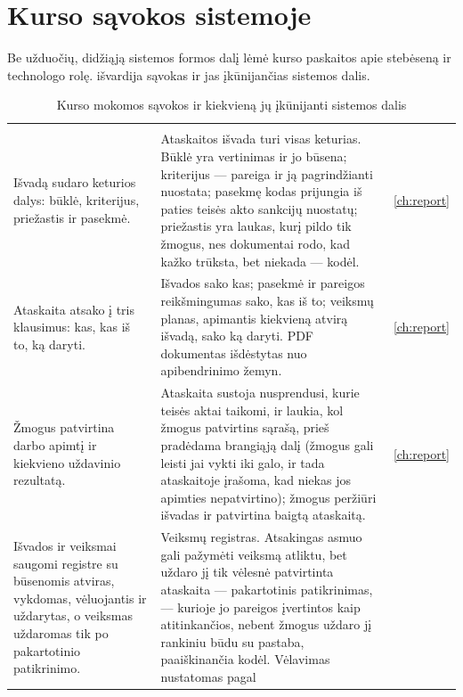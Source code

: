 \section{Kurso sąvokos sistemoje}\label{sec:course:concepts}

Be užduočių, didžiąją sistemos formos dalį lėmė kurso paskaitos apie stebėseną ir technologo
rolę.  išvardija sąvokas ir jas įkūnijančias sistemos dalis.

\begin{xltabular}{\textwidth}{@{}L{40mm}YL{20mm}@{}}
\caption{Kurso mokomos sąvokos ir kiekvieną jų įkūnijanti sistemos dalis}\label{tab:course:concepts}\\
\toprule
{} &  &  \\
\midrule
\endfirsthead
\toprule
{} &  &  \\
\midrule
\endhead
\bottomrule
\endlastfoot
Išvadą sudaro keturios dalys: būklė, kriterijus, priežastis ir pasekmė. &
  Ataskaitos išvada turi visas keturias. Būklė yra vertinimas ir jo būsena; kriterijus ---
  pareiga ir ją pagrindžianti nuostata; pasekmę kodas prijungia iš paties teisės akto sankcijų
  nuostatų; priežastis yra laukas, kurį pildo tik žmogus, nes dokumentai rodo, kad kažko
  trūksta, bet niekada --- kodėl. & \cref{ch:report} \\
Ataskaita atsako į tris klausimus: kas, kas iš to, ką daryti. &
  Išvados sako kas; pasekmė ir pareigos reikšmingumas sako, kas iš to; veiksmų planas, apimantis
  kiekvieną atvirą išvadą, sako ką daryti. PDF dokumentas išdėstytas nuo apibendrinimo žemyn. &
  \cref{ch:report} \\
Žmogus patvirtina darbo apimtį ir kiekvieno uždavinio rezultatą. &
  Ataskaita sustoja nusprendusi, kurie teisės aktai taikomi, ir laukia, kol žmogus patvirtins
  sąrašą, prieš pradėdama brangiąją dalį (žmogus gali leisti jai vykti iki galo, ir tada
  ataskaitoje įrašoma, kad niekas jos apimties nepatvirtino); žmogus peržiūri išvadas ir
  patvirtina baigtą ataskaitą. &
  \cref{ch:report} \\
Išvados ir veiksmai saugomi registre su būsenomis atviras, vykdomas, vėluojantis ir uždarytas,
  o veiksmas uždaromas tik po pakartotinio patikrinimo. &
  Veiksmų registras. Atsakingas asmuo gali pažymėti veiksmą atliktu, bet uždaro jį tik vėlesnė
  patvirtinta ataskaita --- pakartotinis patikrinimas, --- kurioje jo pareigos įvertintos kaip atitinkančios, nebent
  žmogus uždaro jį rankiniu būdu su pastaba, paaiškinančia kodėl. Vėlavimas nustatomas pagal

\end{xltabular}
